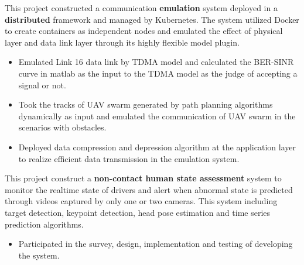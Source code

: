 \documentclass{resume}
\begin{document}
This project constructed a communication \textbf{emulation} system deployed in a \textbf{distributed} framework and managed by Kubernetes. The system utilized Docker to create containers as independent nodes and emulated the effect of physical layer and data link layer through its highly flexible model plugin. 
\begin{itemize}
  \item Emulated Link 16 data link by TDMA model and calculated the BER-SINR curve in matlab as the input to the TDMA model as the judge of accepting a signal or not. 
  \item Took the tracks of UAV swarm generated by path planning algorithms dynamically as input and emulated the communication of UAV swarm in the scenarios with obstacles.
  \item Deployed data compression and depression algorithm at the application layer to realize efficient data transmission in the emulation system.
\end{itemize}

This project construct a \textbf{non-contact human state assessment} system to monitor the realtime state of drivers and alert when abnormal state is predicted through videos captured by only one or two cameras. This system including target detection, keypoint detection, head pose estimation and time series prediction algorithms.
\begin{itemize}
  \item Participated in the survey, design, implementation and testing of developing the system.
\end{itemize}
\end{document}

